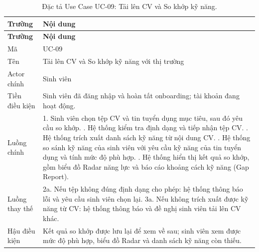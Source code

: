 \begin{longtable}{|L{3.5cm}|L{10cm}|}
\caption{Đặc tả Use Case UC-09: Tải lên CV và So khớp kỹ năng.}
\label{tab:uc09} \\
\hline
\textbf{Trường} & \textbf{Nội dung} \\
\hline
\endfirsthead
\hline
\textbf{Trường} & \textbf{Nội dung} \\
\hline
\endhead
Mã & UC-09 \\
\hline
Tên & Tải lên CV và So khớp kỹ năng với thị trường \\
\hline
Actor chính & Sinh viên \\
\hline
Tiền điều kiện & Sinh viên đã đăng nhập và hoàn tất onboarding; tài khoản đang hoạt động. \\
\hline
Luồng chính & 1. Sinh viên chọn tệp CV và tin tuyển dụng mục tiêu, sau đó yêu cầu so khớp. . Hệ thống kiểm tra định dạng và tiếp nhận tệp CV. . Hệ thống trích xuất danh sách kỹ năng từ nội dung CV. . Hệ thống so sánh kỹ năng của sinh viên với yêu cầu kỹ năng của tin tuyển dụng và tính mức độ phù hợp. . Hệ thống hiển thị kết quả so khớp, gồm biểu đồ Radar năng lực và báo cáo khoảng cách kỹ năng (Gap Report). \\
\hline
Luồng thay thế & 2a. Nếu tệp không đúng định dạng cho phép: hệ thống thông báo lỗi và yêu cầu sinh viên chọn lại. \newline 3a. Nếu không trích xuất được kỹ năng từ CV: hệ thống thông báo và đề nghị sinh viên tải lên CV khác. \\
\hline
Hậu điều kiện & Kết quả so khớp được lưu lại để xem về sau; sinh viên xem được mức độ phù hợp, biểu đồ Radar và danh sách kỹ năng còn thiếu. \\
\hline
\end{longtable}

